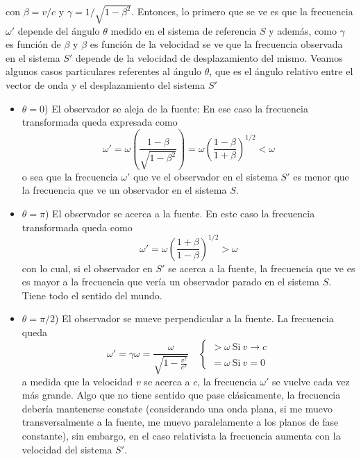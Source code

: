 con $\beta = v/c$ y $\gamma = 1/\sqrt{1-\beta^{2}}$. Entonces, lo primero que se ve es que la frecuencia $\omega'$ depende del ángulo $\theta$ medido en el sistema de referencia $S$ y además, como $\gamma$ es función de $\beta$ y $\beta$ es función de la velocidad se ve que la frecuencia observada en el sistema $S'$ depende de la velocidad de desplazamiento del mismo. Veamos algunos casos particulares referentes al ángulo $\theta$, que es el ángulo relativo entre el vector de onda y el desplazamiento del sistema $S'$
\begin{itemize}
    \item $\theta = 0$) El observador se aleja de la fuente: En ese caso la frecuencia transformada queda expresada como
    \begin{equation*}
        \omega' = \omega 
        \left(
            \frac{1 - \beta}{\sqrt{1- \beta^{2}}}
        \right)
        = \omega
        \left(
            \frac{1 - \beta}{1 + \beta}
        \right)^{1/2}< \omega
    \end{equation*}
    o sea que la frecuencia $\omega'$ que ve el observador en el sistema $S'$ es menor que la frecuencia que ve un observador en el sistema $S$.
    \item $\theta = \pi$) El observador se acerca a la fuente. En este caso la frecuencia transformada queda como
    \begin{equation*}
        \omega' = \omega
        \left(
            \frac{1 + \beta}{1 - \beta}
        \right)^{1/2} > \omega
    \end{equation*}
    con lo cual, si el observador en $S'$ se acerca a la fuente, la frecuencia que ve es es mayor a la frecuencia que vería un observador parado en el sistema $S$. Tiene todo el sentido del mundo.
    \item $\theta = \pi/2$) El observador se mueve perpendicular a la fuente. La frecuencia queda
    \begin{equation*}
        \omega ' = 
        \gamma \omega = \frac{\omega}{\sqrt{1 - \frac{v^{2}}{c^{2}}}}
        \quad
        \left\{
            \begin{matrix}
                > \omega\ \mbox{Si}\ v\to c\\
                \\
                = \omega\ \mbox{Si}\ v = 0
            \end{matrix}
        \right.
        \end{equation*}
    a medida que la velocidad $v$ se acerca a $c$, la frecuencia $\omega'$ se vuelve cada vez más grande. Algo que no tiene sentido que pase clásicamente, la frecuencia debería mantenerse constate (considerando una onda plana, si me muevo transversalmente a la fuente, me muevo paralelamente a los planos de fase constante), sin embargo, en el caso relativista la frecuencia aumenta con la velocidad del sistema $S'$.
\end{itemize}
